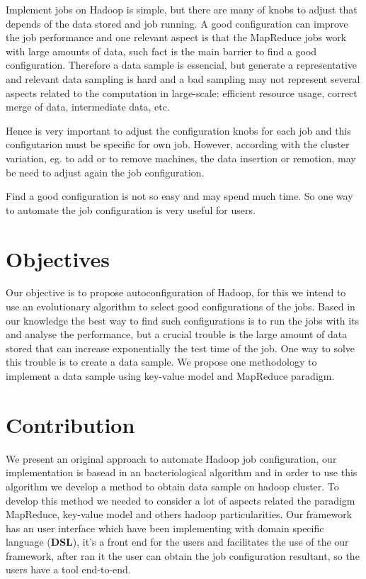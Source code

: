 Implement jobs on Hadoop is simple, but there are many of knobs to adjust that
depends of the data stored and job running. A good configuration can improve the
job performance and one relevant aspect is that the MapReduce jobs work with
large amounts of data, such fact is the main barrier to find a good configuration.
Therefore a data sample is essencial, but generate a representative and relevant
data sampling is hard and a bad sampling may not represent several aspects
related to the computation in large-scale: efficient resource usage, correct
merge of data, intermediate data, etc.

Hence is very important to adjust the configuration knobs for each job and this
configutarion must be specific for own job. However, according with the cluster
variation, eg. to add or to remove machines, the data insertion or remotion,
may be need to adjust again the job configuration.

Find a good configuration is not so easy and may spend much time. So one way
to automate the job configuration is very useful for users.

\section{Objectives}
Our objective is to propose autoconfiguration of Hadoop, for this we intend to
use an evolutionary algorithm \cite{baudry} to select good configurations
of the jobs. Based in our knowledge the best way to find such configurations is
to run the jobs with its and analyse the performance, but a crucial trouble is
the large amount of data stored that can increase exponentially the test time of
the job. One way to solve this trouble is to create a data sample. We propose
one methodology to implement a data sample using key-value model and MapReduce
paradigm.

\section{Contribution}

We present an original approach to automate Hadoop job configuration, our
implementation is basead in an bacteriological algorithm \cite{baudry} and in
order to use this algorithm we develop a method to obtain data sample on
hadoop cluster. To develop this method we needed to consider a lot of
aspects related the paradigm MapReduce, key-value model and others hadoop
particularities. Our framework has an user interface which have been implementing
with domain specific language ({\bf DSL}), it's a front end for the users and
facilitates the use of the our framework, after ran it the user can obtain the
job configuration resultant, so the users have a tool end-to-end.

